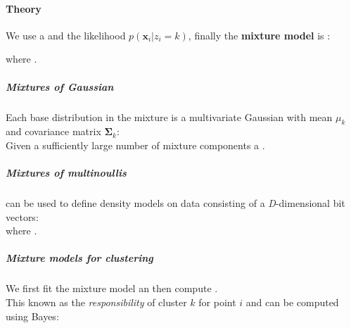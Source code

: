 \paragraph{Theory}
We use a  and the likelihood
$p(\bm{x}_{i}|z_{i} = k)$, finally the \textbf{mixture model} is :
\begin{center}
\end{center}
where .
\subparagraph{Mixtures of Gaussian}
Each base distribution in the mixture is a multivariate Gaussian with mean $\mu_{k}$ 
and covariance matrix $\bm{\Sigma}_{k}$:
\\
Given a sufficiently large number of mixture components a .
\subparagraph{Mixtures of multinoullis}
can be used to define density models on data consisting of a \emph{D}-dimensional bit
vectors: \\
where .
\subparagraph{Mixture models for clustering}
We first fit the mixture model an then compute .\\
This known as the \emph{responsibility} of cluster $k$ for point $i$ and can be computed using 
Bayes:
\begin{center}
\end{center}

